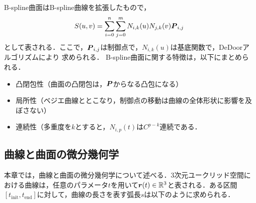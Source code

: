 		B-spline曲面はB-spline曲線を拡張したもので，
		\begin{equation}\label{eq:BsplinePatch}
			S(u,v) = \sum_{i=0}^n \sum_{j=0}^m N_{i,k}(u) N_{j,k}(v) \boldsymbol{P}_{i,j}
		\end{equation}
		として表される．ここで，$ \boldsymbol{P}_{i,j} $は制御点で，$ N_{i,k}(u) $は基底関数で，DeDoorアルゴリズムにより
		求められる．
		B-spline曲面に関する特徴は，以下にまとめられる．
		\begin{itemize}
			\item 凸閉包性（曲面の凸閉包は，$ \boldsymbol{P} $からなる凸包になる）
			\item 局所性（ベジエ曲線ととこなり，制御点の移動は曲線の全体形状に影響を及ぼさない）
			\item 連続性（多重度を$ k $とすると，$ N_{i,p}(t) $は$ C^{p-k} $連続である．
		\end{itemize}
		
 \subsection{曲線と曲面の微分幾何学}
 	本章では，曲線と曲面の微分幾何学について述べる．3次元ユークリッド空間における曲線は，任意のパラメータ$ t $を用いて$ \boldsymbol{r}(t) \in \mathbb{R}^3 $と表される．ある区間$ [t_{\mathrm{init}},t_{\mathrm{end}}] $に対して，曲線の長さを表す弧長$ s $は以下のように求められる．
 	
